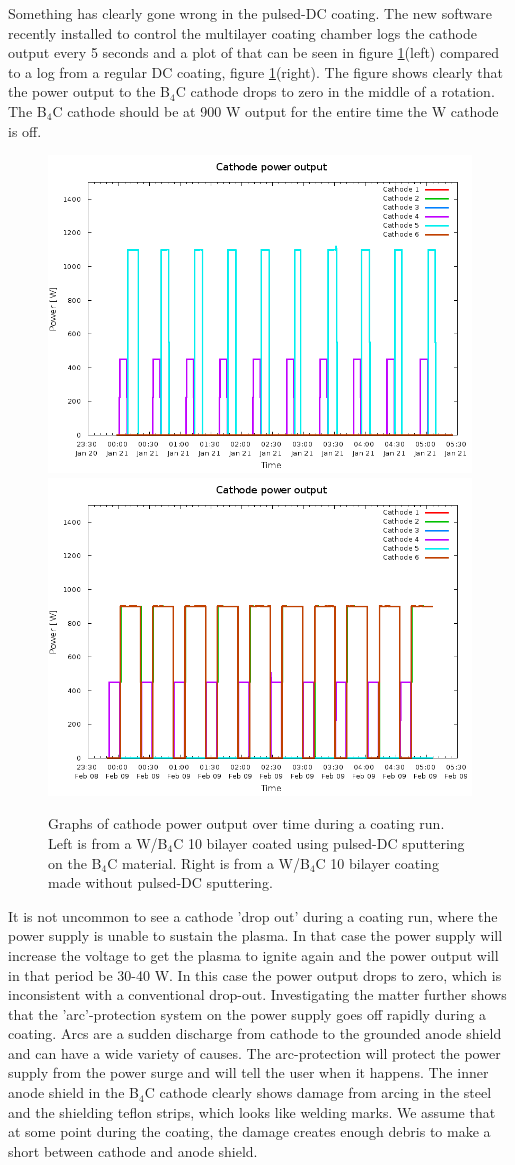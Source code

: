Something has clearly gone wrong in the pulsed-DC coating. The new software recently installed to control the multilayer coating chamber logs the cathode output every 5 seconds and a plot of that can be seen in figure \ref{fig:power-output}(left) compared to a log from a regular DC coating, figure \ref{fig:power-output}(right). The figure shows clearly that the power output to the B$_4$C cathode drops to zero in the middle of a rotation. The B$_4$C cathode should be at 900 W output for the entire time the W cathode is off.

\begin{figure}[!h]
	\center
	\includegraphics[width=0.47\linewidth]{figures/athena/coatings/power_output_rf_coating.png}
	\includegraphics[width=0.47\linewidth]{figures/athena/coatings/power_output_dc_coating.png}
\caption{\footnotesize Graphs of cathode power output over time during a coating run. Left is from a W/B$_4$C 10 bilayer coated using pulsed-DC sputtering on the B$_4$C material. Right is from a W/B$_4$C 10 bilayer coating made without pulsed-DC sputtering.}\label{fig:power-output}
\end{figure}

It is not uncommon to see a cathode 'drop out' during a coating run, where the power supply is unable to sustain the plasma. In that case the power supply will increase the voltage to get the plasma to ignite again and the power output will in that period be 30-40 W. In this case the power output drops to zero, which is inconsistent with a conventional drop-out. Investigating the matter further shows that the 'arc'-protection system on the power supply goes off rapidly during a coating. Arcs are a sudden discharge from cathode to the grounded anode shield and can have a wide variety of causes. The arc-protection will protect the power supply from the power surge and will tell the user when it happens. The inner anode shield in the B$_4$C cathode clearly shows damage from arcing in the steel and the shielding teflon strips, which looks like welding marks. We assume that at some point during the coating, the damage creates enough debris to make a short between cathode and anode shield.

